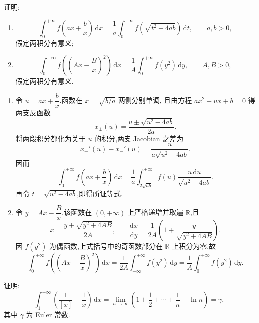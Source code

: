 \begin{example}
  证明:
  \begin{enumerate}
    \item
          \[
            \int_0^{+\infty}f\left(ax+\dfrac{b}{x}\right)\,\mathrm{d}x
            =\dfrac{1}{a}\int_0^{+\infty}f\left(\sqrt{t^2+4ab}\right)\,\mathrm{d}t,
            \qquad a,b>0,
          \]
          假定两积分有意义;
    \item
          \[
            \int_0^{+\infty}f\left(\left(Ax-\dfrac{B}{x}\right)^2\right)\,\mathrm{d}x
            =\dfrac{1}{A}\int_0^{+\infty}f(y^2)\,\mathrm{d}y,
            \qquad A,B>0,
          \]
          假定两积分有意义.
  \end{enumerate}
\end{example}
\exampleblank

\begin{solution}
  \begin{enumerate}
    \item 令 $u=ax+\dfrac{b}{x}$.函数在 $x=\sqrt{b/a}$ 两侧分别单调,
          且由方程 $ax^2-ux+b=0$ 得两支反函数
          \[
            x_\pm(u)=\dfrac{u\pm\sqrt{u^2-4ab}}{2a}.
          \]
          将两段积分都化为关于 $u$ 的积分,两支 Jacobian 之差为
          \[
            x_+'(u)-x_-'(u)=\dfrac{u}{a\sqrt{u^2-4ab}}.
          \]
          因而
          \[
            \int_0^{+\infty}f\left(ax+\dfrac{b}{x}\right)\,\mathrm{d}x
            =\dfrac{1}{a}\int_{2\sqrt{ab}}^{+\infty}
            f(u)\dfrac{u\,\mathrm{d}u}{\sqrt{u^2-4ab}}.
          \]
          再令 $t=\sqrt{u^2-4ab}$,即得所证等式.

    \item 令 $y=Ax-\dfrac{B}{x}$.该函数在 $(0,+\infty)$ 上严格递增并取遍
          $\mathbb{R}$,且
          \[
            x=\dfrac{y+\sqrt{y^2+4AB}}{2A},
            \qquad
            \dfrac{\mathrm{d}x}{\mathrm{d}y}
            =\dfrac{1}{2A}\left(1+\dfrac{y}{\sqrt{y^2+4AB}}\right).
          \]
          因 $f(y^2)$ 为偶函数,上式括号中的奇函数部分在 $\mathbb{R}$ 上积分为零,故
          \[
            \int_0^{+\infty}f\left(\left(Ax-\dfrac{B}{x}\right)^2\right)\,\mathrm{d}x
            =\dfrac{1}{2A}\int_{-\infty}^{+\infty}f(y^2)\,\mathrm{d}y
            =\dfrac{1}{A}\int_0^{+\infty}f(y^2)\,\mathrm{d}y.
          \]
  \end{enumerate}
\end{solution}

\begin{example}[\markstar]
  证明:
  \[
    \int_1^{+\infty}\left(\dfrac{1}{[x]}-\dfrac{1}{x}\right)\,\mathrm{d}x
    =\lim\limits_{n\to\infty}\left(1+\dfrac{1}{2}+\cdots+\dfrac{1}{n}-\ln n\right)
    =\gamma,
  \]
  其中 $\gamma$ 为 Euler 常数.
\end{example}
\exampleblank

